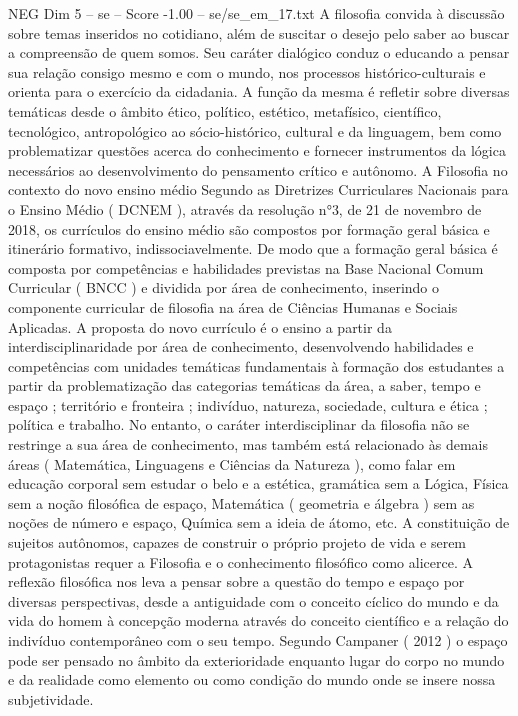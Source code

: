 \begin{textsample}{NEG Dim 5 – se – Score -1.00 – se/se\_em\_17.txt}
A filosofia convida à discussão sobre temas inseridos no cotidiano, além de suscitar o desejo pelo saber ao buscar a compreensão de quem somos.
Seu caráter dialógico conduz o educando a pensar sua relação consigo mesmo e com o mundo, nos processos histórico-culturais e orienta para o exercício da cidadania.
A função da mesma é refletir sobre diversas temáticas desde o âmbito ético, político, estético, metafísico, científico, tecnológico, antropológico ao sócio-histórico, cultural e da linguagem, bem como problematizar questões acerca do conhecimento e fornecer instrumentos da lógica necessários ao desenvolvimento do pensamento crítico e autônomo.
A Filosofia no contexto do novo ensino médio Segundo as Diretrizes Curriculares Nacionais para o Ensino Médio ( DCNEM ), através da resolução n{\EmojiFont °}3, de 21 de novembro de 2018, os currículos do ensino médio são compostos por formação geral básica e itinerário formativo, indissociavelmente.
De modo que a formação geral básica é composta por competências e habilidades previstas na Base Nacional Comum Curricular ( BNCC ) e dividida por área de conhecimento, inserindo o componente curricular de filosofia na área de Ciências Humanas e Sociais Aplicadas.
A proposta do novo currículo é o ensino a partir da interdisciplinaridade por área de conhecimento, desenvolvendo habilidades e competências com unidades temáticas fundamentais à formação dos estudantes a partir da problematização das categorias temáticas da área, a saber, tempo e espaço ; território e fronteira ; indivíduo, natureza, sociedade, cultura e ética ; política e trabalho.
No entanto, o caráter interdisciplinar da filosofia não se restringe a sua área de conhecimento, mas também está relacionado às demais áreas ( Matemática, Linguagens e Ciências da Natureza ), como falar em educação corporal sem estudar o belo e a estética, gramática sem a Lógica, Física sem a noção filosófica de espaço, Matemática ( geometria e álgebra ) sem as noções de número e espaço, Química sem a ideia de átomo, etc.
A constituição de sujeitos autônomos, capazes de construir o próprio projeto de vida e serem protagonistas requer a Filosofia e o conhecimento filosófico como alicerce.
A reflexão filosófica nos leva a pensar sobre a questão do tempo e espaço por diversas perspectivas, desde a antiguidade com o conceito cíclico do mundo e da vida do homem à concepção moderna através do conceito científico e a relação do indivíduo contemporâneo com o seu tempo.
Segundo Campaner ( 2012 ) o espaço pode ser pensado no âmbito da exterioridade enquanto lugar do corpo no mundo e da realidade como elemento ou como condição do mundo onde se insere nossa subjetividade.

\end{textsample}
